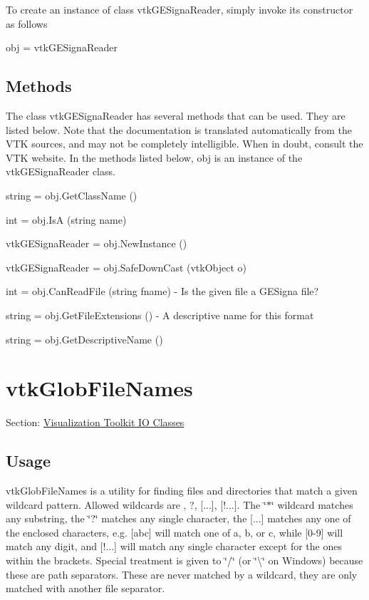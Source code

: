 To create an instance of class vtk\-G\-E\-Signa\-Reader, simply invoke its constructor as follows \begin{DoxyVerb}  obj = vtkGESignaReader
\end{DoxyVerb}
 \hypertarget{vtkwidgets_vtkxyplotwidget_Methods}{}\subsection{Methods}\label{vtkwidgets_vtkxyplotwidget_Methods}
The class vtk\-G\-E\-Signa\-Reader has several methods that can be used. They are listed below. Note that the documentation is translated automatically from the V\-T\-K sources, and may not be completely intelligible. When in doubt, consult the V\-T\-K website. In the methods listed below, {\ttfamily obj} is an instance of the vtk\-G\-E\-Signa\-Reader class. 
\begin{DoxyItemize}
\item {\ttfamily string = obj.\-Get\-Class\-Name ()}  
\item {\ttfamily int = obj.\-Is\-A (string name)}  
\item {\ttfamily vtk\-G\-E\-Signa\-Reader = obj.\-New\-Instance ()}  
\item {\ttfamily vtk\-G\-E\-Signa\-Reader = obj.\-Safe\-Down\-Cast (vtk\-Object o)}  
\item {\ttfamily int = obj.\-Can\-Read\-File (string fname)} -\/ Is the given file a G\-E\-Signa file?  
\item {\ttfamily string = obj.\-Get\-File\-Extensions ()} -\/ A descriptive name for this format  
\item {\ttfamily string = obj.\-Get\-Descriptive\-Name ()}  
\end{DoxyItemize}\hypertarget{vtkio_vtkglobfilenames}{}\section{vtk\-Glob\-File\-Names}\label{vtkio_vtkglobfilenames}
Section\-: \hyperlink{sec_vtkio}{Visualization Toolkit I\-O Classes} \hypertarget{vtkwidgets_vtkxyplotwidget_Usage}{}\subsection{Usage}\label{vtkwidgets_vtkxyplotwidget_Usage}
vtk\-Glob\-File\-Names is a utility for finding files and directories that match a given wildcard pattern. Allowed wildcards are , ?, \mbox{[}...\mbox{]}, \mbox{[}!...\mbox{]}. The \char`\"{}$\ast$\char`\"{} wildcard matches any substring, the \char`\"{}?\char`\"{} matches any single character, the \mbox{[}...\mbox{]} matches any one of the enclosed characters, e.\-g. \mbox{[}abc\mbox{]} will match one of a, b, or c, while \mbox{[}0-\/9\mbox{]} will match any digit, and \mbox{[}!...\mbox{]} will match any single character except for the ones within the brackets. Special treatment is given to \char`\"{}/\char`\"{} (or \char`\"{}\textbackslash{}\char`\"{} on Windows) because these are path separators. These are never matched by a wildcard, they are only matched with another file separator.

